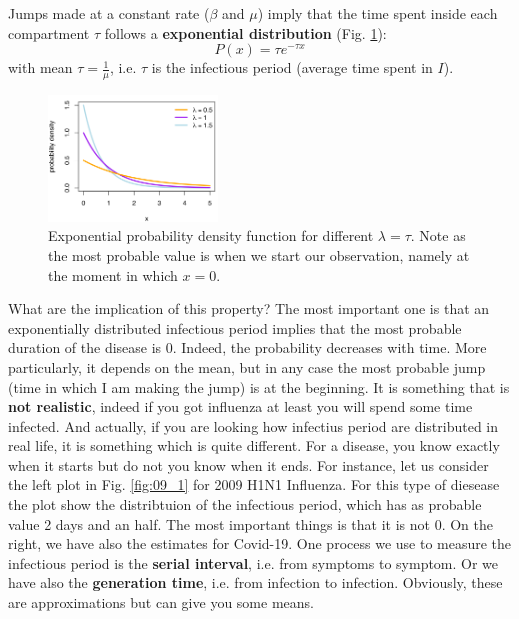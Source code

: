 \documentclass[../main/main.tex]{subfiles}
\begin{document}
Jumps made at a constant rate (\( \beta  \) and \( \mu  \)) imply that the time spent inside each compartment \( \tau  \) follows a \textbf{exponential distribution} (Fig. \ref{fig:09_4}):
\begin{equation}
  P(x) = \tau e^{- \tau x}
\end{equation}
with mean \( \tau = \frac{1}{\mu }\), i.e. \( \tau  \) is the infectious period (average time spent in \( I \)).

\begin{figure}[h!]
\centering
\includegraphics[width=0.4\textwidth]{../lessons/image/09/4.png}
\caption{\label{fig:09_4} Exponential probability density function for different $\lambda = \tau$. Note as the most probable value is when we start our observation, namely at the moment in which $x=0$. }
\end{figure}


What are the implication of this property? The most important one is that an exponentially distributed infectious period implies that the most probable duration of the disease is 0. Indeed, the probability decreases with time.
More particularly, it depends on the mean, but in any case the most probable jump (time in which I am making the jump) is at the beginning.
It is something that is \textbf{not realistic}, indeed if you got influenza at least you will spend some time infected.
And actually, if you are looking how infectius period are distributed in real life, it is something which is quite different. For a disease, you know exactly when it starts but do not you know when it ends.
For instance, let us consider the left plot in Fig. \ref{fig:09_1} for 2009 H1N1 Influenza. For this type of diesease the plot show the distribtuion of the infectious period, which has as probable value 2 days and an half. The most important things is that it is not 0. On the right, we have also the estimates for Covid-19. One process we use to measure the infectious period is the \textbf{serial interval}, i.e. from symptoms to symptom. Or we have also the \textbf{generation time}, i.e. from infection to infection. Obviously, these are approximations but can give you some means.
\end{document}
